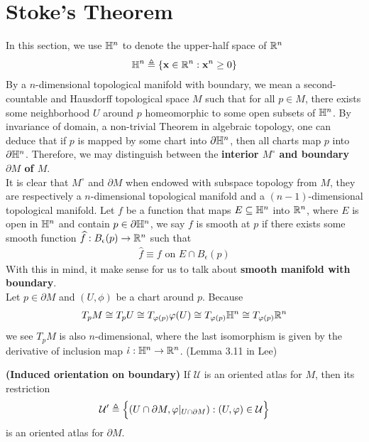 \documentclass{report}
\begin{document}
\section{Stoke's Theorem}
\begin{abstract}

\end{abstract}
\begin{mdframed}
In this section, we use  $\mathbb{H}^n$ to denote the upper-half space of $\mathbb{R}^n$
\begin{align*}
\mathbb{H}^n \triangleq \{ \textbf{x}\in \mathbb{R}^n: \textbf{x}^n \geq 0 \}
\end{align*}
By a $n$-dimensional topological manifold with boundary, we mean a second-countable and Hausdorff topological space $M$ such that for all $p \in M$, there exists some neighborhood $U$ around  $p$ homeomorphic to some open subsets of  $\mathbb{H}^n$. By invariance of domain, a non-trivial Theorem in algebraic topology, one can deduce that if $p$ is mapped by some chart into $\partial \mathbb{H}^n$, then all charts map $p$ into  $\partial \mathbb{H}^n$. Therefore, we may distinguish between the \textbf{interior $M^\circ $ and boundary $\partial M$ of $M$}.  \\

It is clear that $M^\circ $ and $\partial M$ when endowed with subspace topology from $M$, they are respectively a $n$-dimensional topological  manifold and a $(n-1)$-dimensional topological manifold. Let $f$ be a function that maps $E\subseteq \mathbb{H}^n$ into $\mathbb{R}^n$, where $E$ is open in  $\mathbb{H}^n$ and contain $p \in \partial \mathbb{H}^n$, we say $f$ is smooth at $p$ if there exists some smooth function $\widehat{f}:B_\epsilon (p)\rightarrow \mathbb{R}^n$ such that 
\begin{align*}
\widehat{f}\equiv f \text{ on }E\cap B_\epsilon (p)
\end{align*}
With this in mind, it make sense for us to talk about \textbf{smooth manifold with boundary}. \\

Let $p \in \partial M$ and $(U,\phi)$ be a chart around $p$. Because
\begin{align*}
T_pM\cong  T_p U\cong  T_{\varphi (p)}\varphi (U)\cong  T_{\varphi (p)} \mathbb{H}^n \cong  T_{\varphi (p)}\mathbb{R}^n
\end{align*}
we see $T_pM$ is also  $n$-dimensional, where the last isomorphism is given by the derivative of inclusion map $\dot{\iota}: \mathbb{H}^n\rightarrow \mathbb{R}^n $. (Lemma 3.11 in Lee) 
\end{mdframed}
\begin{theorem}
\textbf{(Induced orientation on boundary)} If $\mathcal{U}$ is an oriented atlas for $M$, then its restriction 
\begin{align*}
\mathcal{U}'\triangleq \Big\{ (U\cap \partial M,\varphi |_{U \cap \partial M}): (U,\varphi) \in \mathcal{U} \Big\}
\end{align*}
is an oriented atlas for $\partial M$. 
\end{theorem}
\end{document}
